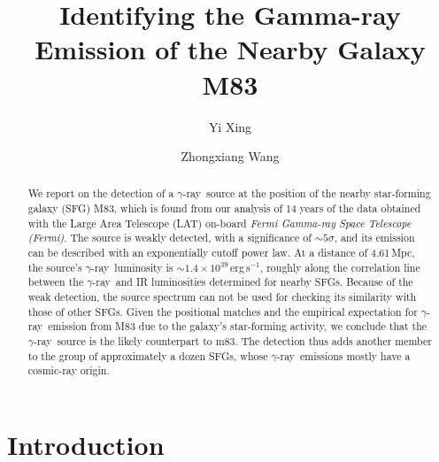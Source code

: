 \documentclass[twocolumn]{aastex631}
\newcommand{\gr}{$\gamma$-ray}
\begin{document}
\title{Identifying the Gamma-ray Emission of the Nearby Galaxy M83}

\author{Yi Xing}


\author{Zhongxiang Wang}

\begin{abstract}
We report on the detection of a \gr\ source at the position of the nearby 
	star-forming galaxy (SFG) M83, which is found from our analysis of
	14 years of the data obtained with the Large Area Telescope (LAT) 
	on-board {\it Fermi Gamma-ray Space Telescope (Fermi)}. 
	The source is weakly detected, with a significance of $\sim 5\sigma$,
	and its emission can be described with an exponentially cutoff power 
	law. At a distance of 4.61\,Mpc, the source's \gr\ luminosity is
	$\sim 1.4\times 10^{39}$\,erg\,s$^{-1}$, roughly along the correlation
	line between the \gr\ and IR luminosities determined for nearby
	SFGs. Because of the weak detection, the source 
	spectrum can not be used for checking its similarity with those of
	other SFGs. Given the positional matches and the empirical
	expectation 
	for \gr\ emission from M83 due to the galaxy's star-forming activity, 
	we conclude that the \gr\ source is the 
	likely counterpart to m83. The detection thus adds another member to
	the group of approximately a dozen SFGs, whose \gr\ emissions mostly
	have a cosmic-ray origin.
\end{abstract}


\section{Introduction}
\end{document}
